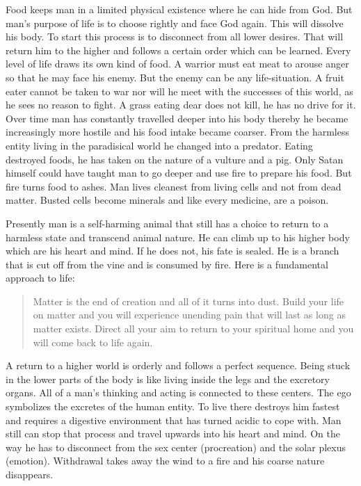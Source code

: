 \documentclass[landscape,twocolumn,letterpaper]{article}
\begin{document}
Food keeps man in a limited physical existence where he can hide from
God. But man's purpose of life is to choose rightly and face God
again. This will dissolve his body. To start this process is to
disconnect from all lower desires. That will return him to the higher
and follows a certain order which can be learned. Every level of life
draws its own kind of food. A warrior must eat meat to arouse anger so
that he may face his enemy. But the enemy can be any life-situation. A
fruit eater cannot be taken to war nor will he meet with the successes
of this world, as he sees no reason to fight. A grass eating dear does
not kill, he has no drive for it. Over time man has constantly
travelled deeper into his body thereby he became increasingly more
hostile and his food intake became coarser. From the harmless entity
living in the paradisical world he changed into a predator. Eating
destroyed foods, he has taken on the nature of a vulture and a
pig. Only Satan himself could have taught man to go deeper and use
fire to prepare his food. But fire turns food to ashes. Man lives
cleanest from living cells and not from dead matter. Busted cells
become minerals and like every medicine, are a poison.

Presently man is a self-harming animal that still has a choice to
return to a harmless state and transcend animal nature. He can climb
up to his higher body which are his heart and mind. If he does not,
his fate is sealed. He is a branch that is cut off from the vine and
is consumed by fire. Here is a fundamental approach to life:
\begin{quote} Matter is the end of creation and all of it turns into
dust. Build your life on matter and you will experience unending pain
that will last as long as matter exists. Direct all your aim to return
to your spiritual home and you will come back to life again.
\end{quote}

A return to a higher world is orderly and follows a perfect
sequence. Being stuck in the lower parts of the body is like living
inside the legs and the excretory organs. All of a man's thinking and
acting is connected to these centers. The ego symbolizes the excretes
of the human entity. To live there destroys him fastest and requires a
digestive environment that has turned acidic to cope with. Man still
can stop that process and travel upwards into his heart and mind. On
the way he has to disconnect from the sex center (procreation) and the
solar plexus (emotion). Withdrawal takes away the wind to a fire and
his coarse nature disappears.
\end{document}
